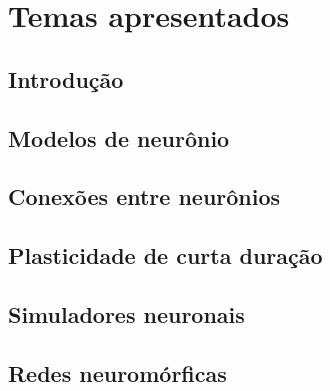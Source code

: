 \chapter{Temas apresentados}\label{cap:temas}
\section{Introdução}\label{sec:temas_intro}

\section{Modelos de neurônio}\label{sec:modelos}

\section{Conexões entre neurônios}\label{sec:conexoes}

\section{Plasticidade de curta duração}\label{sec:plasticidade}

\section{Simuladores neuronais}\label{sec:simuladores}

\section{Redes neuromórficas}\label{sec:redes}
